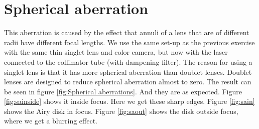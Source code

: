 \documentclass[a4paper,12pt]{article}
\begin{document}
\section{Spherical aberration}
This aberration is caused by the effect that annuli of a lens that are of different radii have different focal lengths. We use the same set-up as the previous exercise with the same thin singlet lens and color camera, but now with the laser connected to the collimator tube (with dampening filter). The reason for using a singlet lens is that it has more spherical aberration than doublet lenses. Doublet lenses are designed to reduce spherical aberration almost to zero. The result can be seen in figure \ref{fig:Spherical aberrations}. And they are as expected. Figure \ref{fig:sainside} shows it inside focus. Here we get these sharp edges. Figure \ref{fig:sain} shows the Airy disk in focus. Figure \ref{fig:saout} shows the disk outside focus, where we get a blurring effect.
\end{document}
